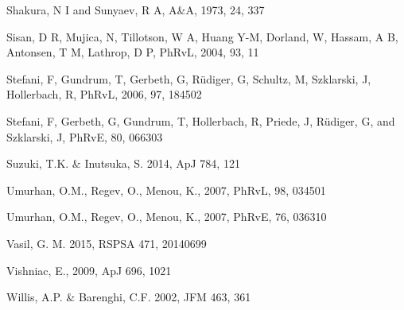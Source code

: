 \documentclass{emulateapj}
\begin{document}
\begin{thebibliography}{53}
Shakura, N I and Sunyaev, R A, A\&A, 1973, 24, 337

Sisan, D R, Mujica, N, Tillotson, W A, Huang Y-M, Dorland, W, Hassam, A B, Antonsen, T M, Lathrop, D P, PhRvL, 2004, 93, 11

Stefani, F, Gundrum, T, Gerbeth, G, R\"udiger, G, Schultz, M, Szklarski, J, Hollerbach, R, PhRvL, 2006, 97, 184502

Stefani, F, Gerbeth, G, Gundrum, T, Hollerbach, R, Priede, J, R\"udiger, G, and Szklarski, J, PhRvE, 80, 066303

Suzuki, T.K. \& Inutsuka, S. 2014, ApJ 784, 121

Umurhan, O.M., Regev, O., Menou, K., 2007, PhRvL, 98, 034501

Umurhan, O.M., Regev, O., Menou, K., 2007, PhRvE, 76, 036310

Vasil, G. M. 2015, RSPSA 471, 20140699

Vishniac, E., 2009, ApJ 696, 1021

Willis, A.P. \& Barenghi, C.F. 2002, JFM 463, 361

\end{thebibliography}
\end{document}
